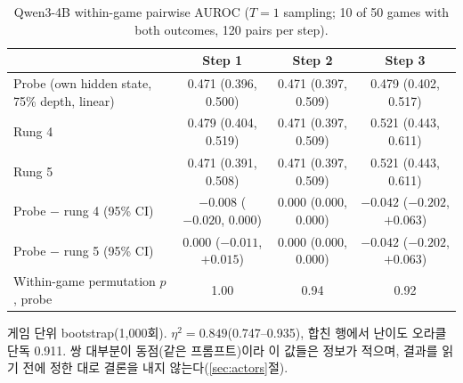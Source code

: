\documentclass[11pt]{article}
\begin{document}
\begin{table}[h]
\centering\small
\caption{Qwen3-4B within-game pairwise AUROC ($T = 1$ sampling; 10 of 50 games with both outcomes, 120 pairs per step).}\label{tab:a3}
\begin{tabularx}{\linewidth}{@{}Lccc@{}}
\toprule
 & Step 1 & Step 2 & Step 3 \\
\midrule
Probe (own hidden state, 75\% depth, linear) & 0.471 (0.396, 0.500) & 0.471 (0.397, 0.509) & 0.479 (0.402, 0.517) \\
Rung 4 & 0.479 (0.404, 0.519) & 0.471 (0.397, 0.509) & 0.521 (0.443, 0.611) \\
Rung 5 & 0.471 (0.391, 0.508) & 0.471 (0.397, 0.509) & 0.521 (0.443, 0.611) \\
Probe $-$ rung 4 (95\% CI) & $-0.008$ ($-0.020$, 0.000) & 0.000 (0.000, 0.000) & $-0.042$ ($-0.202$, $+0.063$) \\
Probe $-$ rung 5 (95\% CI) & 0.000 ($-0.011$, $+0.015$) & 0.000 (0.000, 0.000) & $-0.042$ ($-0.202$, $+0.063$) \\
Within-game permutation $p$, probe & 1.00 & 0.94 & 0.92 \\
\bottomrule
\end{tabularx}
\par\smallskip\raggedright\footnotesize
게임 단위 bootstrap(1,000회). $\eta^2 = 0.849$(0.747--0.935), 합친 행에서 난이도 오라클 단독 0.911. 쌍 대부분이 동점(같은 프롬프트)이라 이 값들은 정보가 적으며, 결과를 읽기 전에 정한 대로 결론을 내지 않는다(\ref{sec:actors}절).
\end{table}
\end{document}
